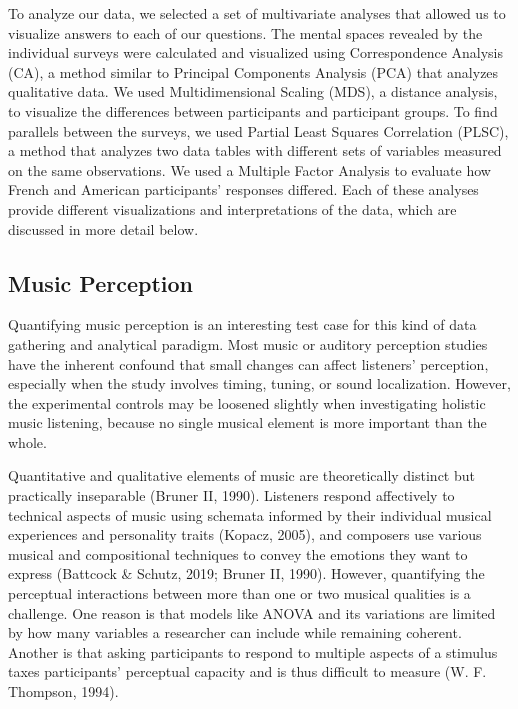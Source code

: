 \documentclass[
  english,
  man,floatsintext]{apa6}
\begin{document}
To analyze our data, we selected a set of multivariate analyses that allowed us to visualize answers to each of our questions. The mental spaces revealed by the individual surveys were calculated and visualized using Correspondence Analysis (CA), a method similar to Principal Components Analysis (PCA) that analyzes qualitative data. We used Multidimensional Scaling (MDS), a distance analysis, to visualize the differences between participants and participant groups. To find parallels between the surveys, we used Partial Least Squares Correlation (PLSC), a method that analyzes two data tables with different sets of variables measured on the same observations. We used a Multiple Factor Analysis to evaluate how French and American participants' responses differed. Each of these analyses provide different visualizations and interpretations of the data, which are discussed in more detail below.

\hypertarget{music-perception}{%
\subsection{Music Perception}\label{music-perception}}

Quantifying music perception is an interesting test case for this kind of data gathering and analytical paradigm. Most music or auditory perception studies have the inherent confound that small changes can affect listeners' perception, especially when the study involves timing, tuning, or sound localization. However, the experimental controls may be loosened slightly when investigating holistic music listening, because no single musical element is more important than the whole.

Quantitative and qualitative elements of music are theoretically distinct but practically inseparable (Bruner II, 1990). Listeners respond affectively to technical aspects of music using schemata informed by their individual musical experiences and personality traits (Kopacz, 2005), and composers use various musical and compositional techniques to convey the emotions they want to express (Battcock \& Schutz, 2019; Bruner II, 1990). However, quantifying the perceptual interactions between more than one or two musical qualities is a challenge. One reason is that models like ANOVA and its variations are limited by how many variables a researcher can include while remaining coherent. Another is that asking participants to respond to multiple aspects of a stimulus taxes participants' perceptual capacity and is thus difficult to measure (W. F. Thompson, 1994).
\end{document}
